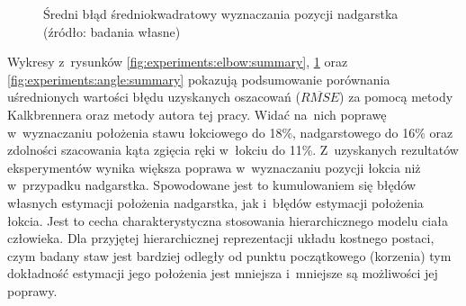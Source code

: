 	\begin{figure}[!htb]
		\centering
		\caption{Średni błąd średniokwadratowy wyznaczania pozycji nadgarstka (źródło: badania własne)}
		\label{fig:experiments:wrist:summary}
	\end{figure}

Wykresy z~rysunków \ref{fig:experiments:elbow:summary}, \ref{fig:experiments:wrist:summary} oraz \ref{fig:experiments:angle:summary} pokazują podsumowanie porównania uśrednionych wartości błędu uzyskanych oszacowań ($\overline{RMSE}$) za pomocą metody Kalkbrennera oraz metody autora tej pracy.
Widać na~nich poprawę w~wyznaczaniu położenia stawu łokciowego do 18\%, nadgarstowego do 16\% oraz zdolności szacowania kąta zgięcia ręki w~łokciu do 11\%. Z~uzyskanych rezultatów eksperymentów wynika większa poprawa w~wyznaczaniu pozycji łokcia niż w~przypadku nadgarstka. Spowodowane jest to kumulowaniem się błędów własnych estymacji położenia nadgarstka, jak i~błędów estymacji położenia łokcia. Jest to cecha charakterystyczna stosowania hierarchicznego modelu ciała człowieka. Dla przyjętej hierarchicznej reprezentacji układu kostnego postaci, czym badany staw jest bardziej odległy od punktu początkowego (korzenia) tym dokładność estymacji jego położenia jest mniejsza i~mniejsze są możliwości jej poprawy.

